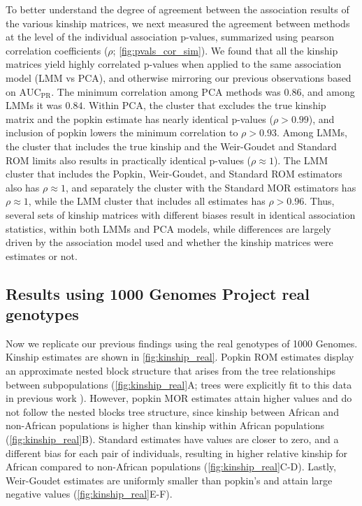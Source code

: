 \documentclass[11pt]{article}
\newcommand{\auc}{\text{AUC}_\text{PR}}
\begin{document}
To better understand the degree of agreement between the association results of the various kinship matrices, we next measured the agreement between methods at the level of the individual association p-values, summarized using pearson correlation coefficients ($\rho$; \cref{fig:pvals_cor_sim}).
We found that all the kinship matrices yield highly correlated p-values when applied to the same association model (LMM vs PCA), and otherwise mirroring our previous observations based on $\auc$.
The minimum correlation among PCA methods was $0.86$, and among LMMs it was $0.84$.
Within PCA, the cluster that excludes the true kinship matrix and the popkin estimate has nearly identical p-values ($\rho > 0.99$), and inclusion of popkin lowers the minimum correlation to $\rho > 0.93$.
Among LMMs, the cluster that includes the true kinship and the Weir-Goudet and Standard ROM limits also results in practically identical p-values ($\rho \approx 1$).
The LMM cluster that includes the Popkin, Weir-Goudet, and Standard ROM estimators also has $\rho \approx 1$, and separately the cluster with the Standard MOR estimators has $\rho \approx 1$, while the LMM cluster that includes all estimates has $\rho > 0.96$.
Thus, several sets of kinship matrices with different biases result in identical association statistics, within both LMMs and PCA models, while differences are largely driven by the association model used and whether the kinship matrices were estimates or not.

\subsection{Results using 1000 Genomes Project real genotypes}

Now we replicate our previous findings using the real genotypes of 1000 Genomes.
Kinship estimates are shown in \cref{fig:kinship_real}.
Popkin ROM estimates display an approximate nested block structure that arises from the tree relationships between subpopulations (\cref{fig:kinship_real}A; trees were explicitly fit to this data in previous work \citep{yao_limitations_2022}).
However, popkin MOR estimates attain higher values and do not follow the nested blocks tree structure, since kinship between African and non-African populations is higher than kinship within African populations (\cref{fig:kinship_real}B).
Standard estimates have values are closer to zero, and a different bias for each pair of individuals, resulting in higher relative kinship for African compared to non-African populations (\cref{fig:kinship_real}C-D).
Lastly, Weir-Goudet estimates are uniformly smaller than popkin's and attain large negative values (\cref{fig:kinship_real}E-F).
\end{document}
